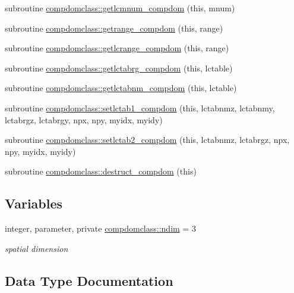 \begin{DoxyCompactItemize}
\item 
subroutine \mbox{\hyperlink{namespacecompdomclass_a545b0a4e8dce9ec9c326806ed1b36598}{compdomclass\+::getlcmnum\+\_\+compdom}} (this, mnum)
\item 
subroutine \mbox{\hyperlink{namespacecompdomclass_acba710aa1017492e05a537273742cc16}{compdomclass\+::getrange\+\_\+compdom}} (this, range)
\item 
subroutine \mbox{\hyperlink{namespacecompdomclass_ad0a907860c5bf17c263d8ad957c7ed1d}{compdomclass\+::getlcrange\+\_\+compdom}} (this, range)
\item 
subroutine \mbox{\hyperlink{namespacecompdomclass_ab679e7ac8218e1580f1a45a53d1fe9f1}{compdomclass\+::getlctabrg\+\_\+compdom}} (this, lctable)
\item 
subroutine \mbox{\hyperlink{namespacecompdomclass_a7c7c1450a459bb1753ef8230ab0d7651}{compdomclass\+::getlctabnm\+\_\+compdom}} (this, lctable)
\item 
subroutine \mbox{\hyperlink{namespacecompdomclass_a60f5ad087b624e541fe9c0872e1c4b90}{compdomclass\+::setlctab1\+\_\+compdom}} (this, lctabnmz, lctabnmy, lctabrgz, lctabrgy, npx, npy, myidx, myidy)
\item 
subroutine \mbox{\hyperlink{namespacecompdomclass_a4bc32865e40fe6b277898a429caff3ca}{compdomclass\+::setlctab2\+\_\+compdom}} (this, lctabnmz, lctabrgz, npx, npy, myidx, myidy)
\item 
subroutine \mbox{\hyperlink{namespacecompdomclass_ae220a1544909bd8851faed61ce9ad7b8}{compdomclass\+::destruct\+\_\+compdom}} (this)
\end{DoxyCompactItemize}
\subsection*{Variables}
\begin{DoxyCompactItemize}
\item 
integer, parameter, private \mbox{\hyperlink{namespacecompdomclass_a01f031d8af670f66db4484cd6411e99f}{compdomclass\+::ndim}} = 3
\begin{DoxyCompactList}\small\item\em spatial dimension \end{DoxyCompactList}\end{DoxyCompactItemize}


\subsection{Data Type Documentation}
\label{structcompdomclass_1_1compdom}
